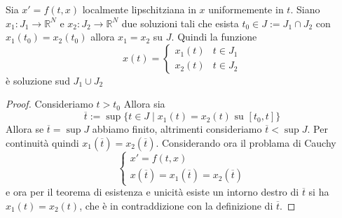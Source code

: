 \begin{remark}
    Sia \(x' = f(t, x)\) localmente lipschitziana in \(x\) uniformemente in
    \(t\). Siano \(x_{1}: J_{1} \to \mathbb{R}^{N}\) e \(x_{2}: J_{2} \to
    \mathbb{R}^{N}\) due soluzioni tali che esista \(t_{0} \in J := J_{1}\cap
    J_{2}\) con \(x_{1}(t_{0}) = x_{2}(t_{0})\) allora \(x_{1} = x_{2}\) su
    \(J\).
    Quindi la funzione 
    \[
        x(t) = \begin{cases}
            x_{1}(t) & t \in J_{1} \\
            x_{2}(t) & t \in J_{2}
        \end{cases}
    \]
    è soluzione sud \(J_{1} \cup J_{2}\) 
\end{remark}
\begin{proof}
    Consideriamo \(t > t_{0}\) Allora sia 
    \[
        \overline{t} := \sup \{ t \in J \mid x_{1}(t) = x_{2}(t) \text{ su }
        [t_{0}, t] \}
    \]
    Allora se \(\overline{t} = \sup J\) abbiamo finito, altrimenti consideriamo
    \(\overline{t} < \sup J\). Per continuità quindi \(x_{1}(\overline{t}) =
    x_{2}(\overline{t})\). Considerando ora il problama di Cauchy
    \[
        \begin{cases}
            x' = f(t, x) \\
            x(\overline{t}) = x_{1}(\overline{t}) = x_{2}(\overline{t})
        \end{cases}
    \]
    e ora per il teorema di esistenza e unicità esiste un intorno destro di
    \(\overline{t}\) si ha \(x_{1}(t) = x_{2}(t)\), che è in contraddizione con
    la definizione di \(\overline{t}\).
\end{proof}

